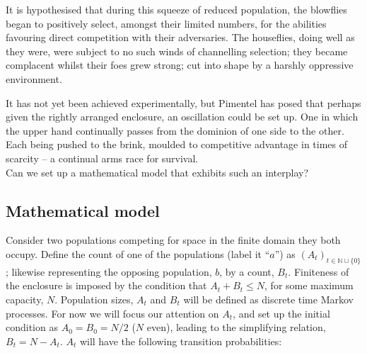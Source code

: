 It is hypothesised that during this squeeze of reduced population, the blowflies began to positively select, amongst their limited numbers, for the abilities favouring direct competition with their adversaries. The houseflies, doing well as they were, were subject to no such winds of channelling selection; they became complacent whilst their foes grew strong; cut into shape by a harshly oppressive environment.\par
It has not yet been achieved experimentally, but Pimentel has posed that perhaps given the rightly arranged enclosure, an oscillation could be set up. One in which the upper hand continually passes from the dominion of one side to the other. Each being pushed to the brink, moulded to competitive advantage in times of scarcity -- a continual arms race for survival.\\

\noindent
Can we set up a mathematical model that exhibits such an interplay?\\

\subsection*{Mathematical model}
\noindent
Consider two populations competing for space in the finite domain they both occupy. Define the count of one of the populations (label it ``$a$'') as $(A_t)_{t\in\mathbb{N}\cup \{0\}}$; likewise representing the opposing population, $b$, by a count, $B_t$. Finiteness of the enclosure is imposed by the condition that $A_t + B_t \leq N$, for some maximum capacity, $N$. Population sizes, $A_t$ and $B_t$ will be defined as discrete time Markov processes. For now we will focus our attention on $A_t$, and set up the initial condition as $A_0 = B_0 = N/2$ ($N$ even), leading to the simplifying relation, $B_t = N - A_t$. $A_t$ will have the following transition probabilities:

